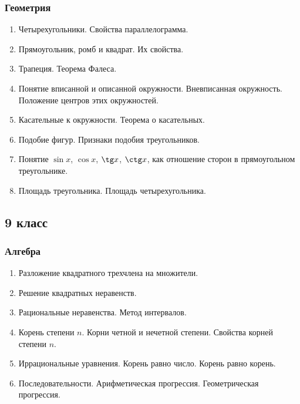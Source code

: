 \documentclass[12pt, a4paper]{article}
\begin{document}
			\subsubsection*{Геометрия}
			\begin{enumerate}[label=\textbf{\arabic*}.]
				\item Четырехугольники. Свойства параллелограмма.
				\item Прямоугольник, ромб и квадрат. Их свойства.
				\item Трапеция. Теорема Фалеса.
				\item Понятие вписанной и описанной окружности. Вневписанная окружность. Положение центров этих окружностей.
				\item Касательные к окружности. Теорема о касательных.
				\item Подобие фигур. Признаки подобия треугольников.
				\item Понятие \( \sin x \), \( \cos x \), \( \tg x \), \( \ctg x \), как отношение сторон в прямоугольном треугольнике.
				\item Площадь треугольника. Площадь четырехугольника.
			\end{enumerate}
		\subsection*{9 класс}
			\subsubsection*{Алгебра}
			\begin{enumerate}[label=\textbf{\arabic*}.]
				\item Разложение квадратного трехчлена на множители.
				\item Решение квадратных неравенств.
				\item Рациональные неравенства. Метод интервалов.
				\item Корень степени \( n \). Корни четной и нечетной степени. Свойства корней степени \( n \).
				\item Иррациональные уравнения. Корень равно число. Корень равно корень.
				\item Последовательности. Арифметическая прогрессия. Геометрическая прогрессия.
			\end{enumerate}
\end{document}
